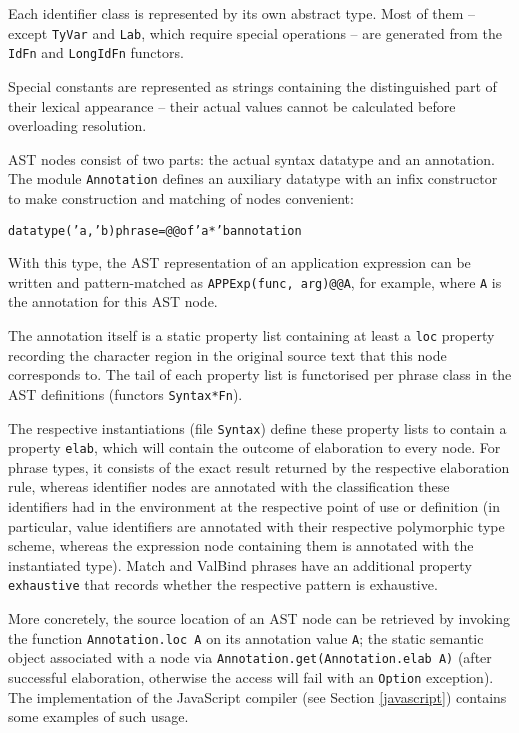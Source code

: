 \documentclass[twoside,titlepage]{article}
\begin{document}
Each identifier class is represented by its own abstract type. Most of them -- except {\tt TyVar} and {\tt Lab}, which require special operations -- are generated from the {\tt IdFn} and {\tt LongIdFn} functors.

Special constants are represented as strings containing the distinguished part of their lexical appearance -- their actual values cannot be calculated before overloading resolution.

AST nodes consist of two parts: the actual syntax datatype and an annotation. The module {\tt Annotation} defines an auxiliary datatype with an infix constructor to make construction and matching of nodes convenient:

\begin{quoting}
\begin{alltt}
datatype ('a, 'b) phrase = @@ of 'a * 'b annotation
\end{alltt}
\end{quoting}

With this type, the AST representation of an application expression can be written and pattern-matched as {\tt APPExp(func, arg)@@A}, for example, where {\tt A} is the annotation for this AST node.

The annotation itself is a static property list containing at least a {\tt loc} property recording the character region in the original source text that this node corresponds to. The tail of each property list is functorised per phrase class in the AST definitions (functors {\tt Syntax*Fn}).

The respective instantiations (file {\tt Syntax}) define these property lists to contain a property {\tt elab}, which will contain the outcome of elaboration to every node. For phrase types, it consists of the exact result returned by the respective elaboration rule, whereas identifier nodes are annotated with the classification these identifiers had in the environment at the respective point of use or definition (in particular, value identifiers are annotated with their respective polymorphic type scheme, whereas the expression node containing them is annotated with the instantiated type).
Match and ValBind phrases have an additional property {\tt exhaustive} that records whether the respective pattern is exhaustive.

More concretely, the source location of an AST node can be retrieved by invoking the function {\tt Annotation.loc A} on its annotation value {\tt A}; the static semantic object associated with a node via {\tt Annotation.get(Annotation.elab A)} (after successful elaboration, otherwise the access will fail with an {\tt Option} exception). The implementation of the JavaScript compiler (see Section \ref{javascript}) contains some examples of such usage.
\end{document}
